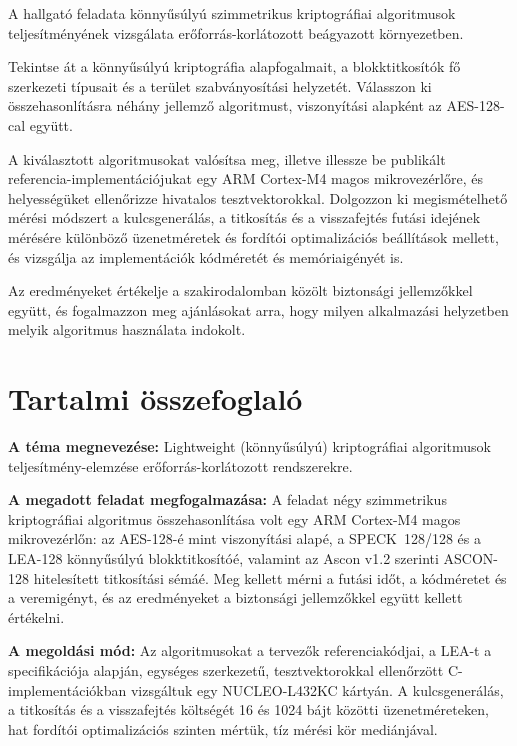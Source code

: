 \documentclass[a4paper,12pt]{report}
\theoremstyle{definition}
\theoremstyle{remark}
\begin{document}
A hallgató feladata könnyűsúlyú szimmetrikus kriptográfiai algoritmusok teljesítményének vizsgálata erőforrás-korlátozott beágyazott környezetben.

Tekintse át a könnyűsúlyú kriptográfia alapfogalmait, a blokktitkosítók fő szerkezeti típusait és a terület szabványosítási helyzetét. Válasszon ki összehasonlításra néhány jellemző algoritmust, viszonyítási alapként az AES-128-cal együtt.

A kiválasztott algoritmusokat valósítsa meg, illetve illessze be publikált referencia-implementációjukat egy ARM Cortex-M4 magos mikrovezérlőre, és helyességüket ellenőrizze hivatalos tesztvektorokkal. Dolgozzon ki megismételhető mérési módszert a kulcsgenerálás, a titkosítás és a visszafejtés futási idejének mérésére különböző üzenetméretek és fordítói optimalizációs beállítások mellett, és vizsgálja az implementációk kódméretét és memóriaigényét is.

Az eredményeket értékelje a szakirodalomban közölt biztonsági jellemzőkkel együtt, és fogalmazzon meg ajánlásokat arra, hogy milyen alkalmazási helyzetben melyik algoritmus használata indokolt.

\chapter*{Tartalmi összefoglaló}

\noindent\textbf{A téma megnevezése:} Lightweight (könnyűsúlyú) kriptográfiai algoritmusok teljesítmény-elemzése erőforrás-korlátozott rendszerekre.

\smallskip
\noindent\textbf{A megadott feladat megfogalmazása:} A feladat négy szimmetrikus kriptográfiai algoritmus összehasonlítása volt egy ARM Cortex-M4 magos mikrovezérlőn: az AES-128-é mint viszonyítási alapé, a SPECK~128/128 és a LEA-128 könnyűsúlyú blokktitkosítóé, valamint az Ascon v1.2 szerinti ASCON-128 hitelesített titkosítási sémáé. Meg kellett mérni a futási időt, a kódméretet és a veremigényt, és az eredményeket a biztonsági jellemzőkkel együtt kellett értékelni.

\smallskip
\noindent\textbf{A megoldási mód:} Az algoritmusokat a tervezők referenciakódjai, a LEA-t a specifikációja alapján, egységes szerkezetű, tesztvektorokkal ellenőrzött C-implementációkban vizsgáltuk egy NUCLEO-L432KC kártyán. A kulcsgenerálás, a titkosítás és a visszafejtés költségét 16 és 1024 bájt közötti üzenetméreteken, hat fordítói optimalizációs szinten mértük, tíz mérési kör mediánjával.
\end{document}
